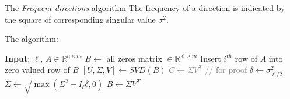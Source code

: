 \documentclass[first=dgreen,second=purple,logo=redque]{aaltoslides}
\begin{document}
\begin{frame}[allowframebreaks=1]{The \textit{Frequent-directions} algorithm}
The \textcolor{dgreen}{frequency} of a direction is indicated by the square of corresponding singular value $\sigma^2$.

\framebreak
The algorithm:
  \begin{algorithmic}
    \State \textbf{Input}: $\ell$, $A \in \mathbb{R}^{n\times m}$
    \State $B \leftarrow $ all zeros matrix $\in \mathbb{R}^{\ell\times m}$
    \State Insert $i^{th}$ row of $A$ into zero valued row of $B$
      \State $[U,\Sigma,V] \leftarrow SVD(B)$
      \textcolor{gray}{\State $C \leftarrow \Sigma V^T$ // for proof}
      \State $\delta \leftarrow \sigma_{\ell/2}^2$
      \State $\breve{\Sigma} \leftarrow \sqrt{\max(\Sigma^2-I_\ell\delta,0)}$
      \State $B\leftarrow \breve{\Sigma}V^T$
    \EndIf
    \EndFor
  \end{algorithmic}
\end{frame}
\end{document}
